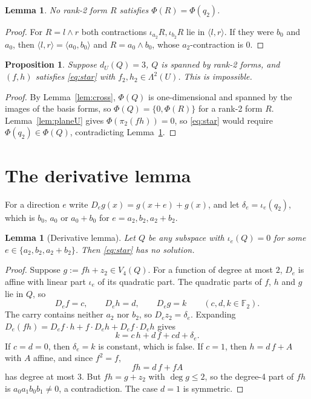 \documentclass[11pt,a4paper]{article}
\theoremstyle{plain}
\newtheorem{lemma}[theorem]{Lemma}
\newtheorem{proposition}[theorem]{Proposition}
\theoremstyle{definition}
\theoremstyle{remark}
\newcommand{\F}{\mathbb{F}_2}
\newcommand{\Lam}{\Lambda^{2}}
\newcommand{\dU}{d_U}
\begin{document}
\begin{lemma}\label{lem:noq2}
No rank-2 form $R$ satisfies $\Phi(R)=\Phi(q_2)$.
\end{lemma}

\begin{proof}
For $R=l\wedge r$ both contractions $\iota_{a_2}R,\iota_{b_2}R$ lie in $\langle l,r\rangle$. If they were $b_0$ and $a_0$, then $\langle l,r\rangle=\langle a_0,b_0\rangle$ and $R=a_0\wedge b_0$, whose $a_2$-contraction is $0$.
\end{proof}

\begin{proposition}\label{prop:B}
Suppose $\dU(Q)=3$, $Q$ is spanned by rank-2 forms, and $(f,h)$ satisfies \eqref{eq:star} with $f_2,h_2\in\Lam(U)$. This is impossible.
\end{proposition}

\begin{proof}
By Lemma~\ref{lem:cross}, $\Phi(Q)$ is one-dimensional and spanned by the images of the basis forms, so $\Phi(Q)=\{0,\Phi(R)\}$ for a rank-2 form $R$. Lemma~\ref{lem:planeU} gives $\Phi(\pi_2(fh))=0$, so \eqref{eq:star} would require $\Phi(q_2)\in\Phi(Q)$, contradicting Lemma~\ref{lem:noq2}.
\end{proof}

\section{The derivative lemma}

For a direction $e$ write $D_eg(x)=g(x+e)+g(x)$, and let $\delta_e=\iota_e(q_2)$, which is $b_0$, $a_0$ or $a_0+b_0$ for $e=a_2,b_2,a_2+b_2$.

\begin{lemma}[Derivative lemma]\label{lem:deriv}
Let $Q$ be any subspace with $\iota_e(Q)=0$ for some $e\in\{a_2,b_2,a_2+b_2\}$. Then \eqref{eq:star} has no solution.
\end{lemma}

\begin{proof}
Suppose $g:=fh+z_2\in V_4(Q)$. For a function of degree at most $2$, $D_e$ is affine with linear part $\iota_e$ of its quadratic part. The quadratic parts of $f$, $h$ and $g$ lie in $Q$, so
\[
  D_ef=c,\qquad D_eh=d,\qquad D_eg=k\qquad(c,d,k\in\F).
\]
The carry contains neither $a_2$ nor $b_2$, so $D_ez_2=\delta_e$. Expanding $D_e(fh)=D_ef\cdot h+f\cdot D_eh+D_ef\cdot D_eh$ gives
\[
  k=c\,h+d\,f+cd+\delta_e .
\]
If $c=d=0$, then $\delta_e=k$ is constant, which is false. If $c=1$, then $h=d\,f+A$ with $A$ affine, and since $f^2=f$,
\[
  fh=d\,f+f A
\]
has degree at most $3$. But $fh=g+z_2$ with $\deg g\le2$, so the degree-4 part of $fh$ is $a_0a_1b_0b_1\neq0$, a contradiction. The case $d=1$ is symmetric.
\end{proof}
\end{document}
